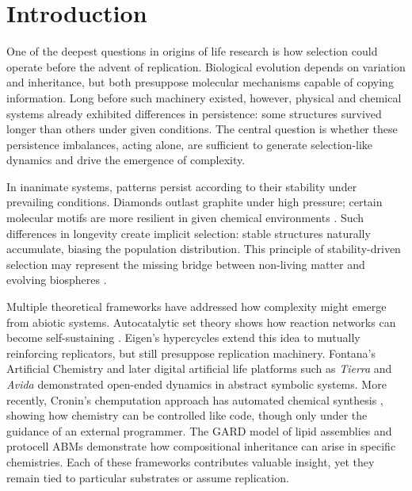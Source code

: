 \documentclass[life,article,submit,pdftex,moreauthors]{Definitions/mdpi}
\begin{document}
\section{Introduction}

One of the deepest questions in origins of life research is how selection could operate before the advent of replication. Biological evolution depends on variation and inheritance, but both presuppose molecular mechanisms capable of copying information. Long before such machinery existed, however, physical and chemical systems already exhibited differences in persistence: some structures survived longer than others under given conditions. The central question is whether these persistence imbalances, acting alone, are sufficient to generate selection-like dynamics and drive the emergence of complexity.


In inanimate systems, patterns persist according to their stability under prevailing conditions. Diamonds outlast graphite under high pressure; certain molecular motifs are more resilient in given chemical environments \cite{davies2006goldilocks}. Such differences in longevity create implicit selection: stable structures naturally accumulate, biasing the population distribution. This principle of stability-driven selection may represent the missing bridge between non-living matter and evolving biospheres \cite{hordijk2012autocatalytic, nghe2015prebiotic}.

Multiple theoretical frameworks have addressed how complexity might emerge from abiotic systems. Autocatalytic set theory shows how reaction networks can become self-sustaining \cite{kauffman1986autocatalytic, hordijk2011required}. Eigen’s hypercycles \cite{eigen} extend this idea to mutually reinforcing replicators, but still presuppose replication machinery. Fontana’s Artificial Chemistry \cite{fontana1991algorithmic} and later digital artificial life platforms such as \textit{Tierra} and \textit{Avida} \cite{ray1992tierra, adami2000avida} demonstrated open-ended dynamics in abstract symbolic systems. More recently, Cronin’s chemputation approach has automated chemical synthesis \cite{cronin2024chemputation}, showing how chemistry can be controlled like code, though only under the guidance of an external programmer. The GARD model of lipid assemblies \cite{segre2000compositional, markovitch2012universal} and protocell ABMs \cite{damer2015coupled} demonstrate how compositional inheritance can arise in specific chemistries. Each of these frameworks contributes valuable insight, yet they remain tied to particular substrates or assume replication.
\end{document}
